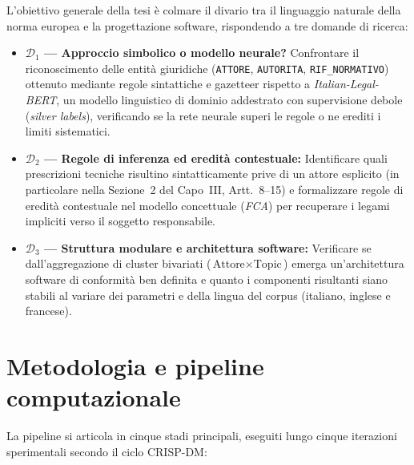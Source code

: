 \documentclass[12pt,a4paper,oneside]{article}
\begin{document}
L'obiettivo generale della tesi è colmare il divario tra il linguaggio naturale della norma europea e la progettazione software, rispondendo a tre domande di ricerca:

\begin{itemize}
    \item \textbf{$\mathcal{D}_1$ --- Approccio simbolico o modello neurale?} Confrontare il riconoscimento delle entità giuridiche (\texttt{ATTORE}, \texttt{AUTORITA}, \texttt{RIF\_NORMATIVO}) ottenuto mediante regole sintattiche e gazetteer rispetto a \emph{Italian-Legal-BERT}, un modello linguistico di dominio addestrato con supervisione debole (\emph{silver labels}), verificando se la rete neurale superi le regole o ne erediti i limiti sistematici.
    \item \textbf{$\mathcal{D}_2$ --- Regole di inferenza ed eredità contestuale:} Identificare quali prescrizioni tecniche risultino sintatticamente prive di un attore esplicito (in particolare nella Sezione~2 del Capo~III, Artt.~8--15) e formalizzare regole di eredità contestuale nel modello concettuale (\emph{FCA}) per recuperare i legami impliciti verso il soggetto responsabile.
    \item \textbf{$\mathcal{D}_3$ --- Struttura modulare e architettura software:} Verificare se dall'aggregazione di cluster bivariati ($\text{Attore} \times \text{Topic}$) emerga un'architettura software di conformità ben definita e quanto i componenti risultanti siano stabili al variare dei parametri e della lingua del corpus (italiano, inglese e francese).
\end{itemize}

\section{Metodologia e pipeline computazionale}

La pipeline si articola in cinque stadi principali, eseguiti lungo cinque iterazioni sperimentali secondo il ciclo CRISP-DM:
\end{document}

